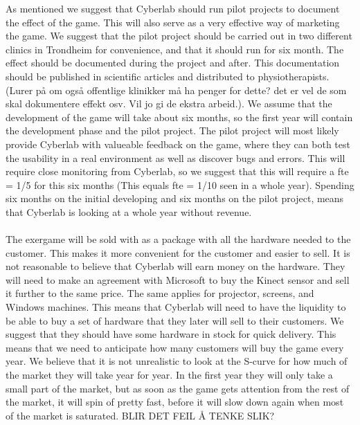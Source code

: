 As mentioned we suggest that Cyberlab should run pilot projects to document the effect of the game. This will also serve as a very effective way of marketing the game. We suggest that the pilot project should be carried out in two different clinics in Trondheim for convenience, and that it should run for six month. The effect should be documented during the project and after. This documentation should be published in scientific articles and distributed to physiotherapists. (Lurer på om også offentlige klinikker må ha penger for dette? det er vel de som skal dokumentere effekt osv. Vil jo gi de ekstra arbeid.). We assume that the development of the game will take about six months, so the first year will contain the development phase and the pilot project. The pilot project will most likely provide Cyberlab with valueable feedback on the game, where they can both test the usability in a real environment as well as discover bugs and errors. This will require close monitoring from Cyberlab, so we suggest that this will require a \ac{fte} = 1/5 for this six months (This equals \ac{fte} = 1/10 seen in a whole year). Spending six months on the initial developing and six months on the pilot project, means that Cyberlab is looking at a whole year without revenue. \\ \\
The exergame will be sold with as a package with all the hardware needed to the customer. This makes it more convenient for the customer and easier to sell. It is not reasonable to believe that Cyberlab will earn money on the hardware. They will need to make an agreement with Microsoft to buy the Kinect sensor and sell it further to the same price. The same applies for projector, screens, and Windows machines. This means that Cyberlab will need to have the liquidity to be able to buy a set of hardware that they later will sell to their customers. We suggest that they should have some hardware in stock for quick delivery. This means that we need to anticipate how many customers will buy the game every year. We believe that it is not unrealistic to look at the S-curve for how much of the market they will take year for year. In the first year they will only take a small part of the market, but as soon as the game gets attention from the rest of the market, it will spin of pretty fast, before it will slow down again when most of the market is saturated. BLIR DET FEIL Å TENKE SLIK?  \\ \\
